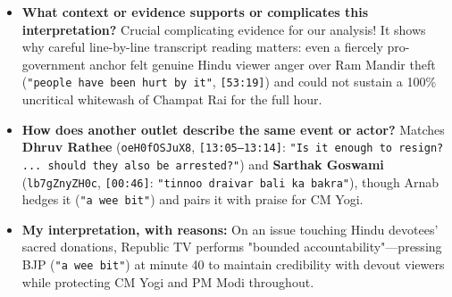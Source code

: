 \documentclass[10pt,a4paper]{article}
\begin{document}
\begin{itemize}[leftmargin=1.5em, itemsep=3pt, topsep=4pt]
  \item \textbf{What context or evidence supports or complicates this interpretation?} Crucial complicating evidence for our analysis! It shows why careful line-by-line transcript reading matters: even a fiercely pro-government anchor felt genuine Hindu viewer anger over Ram Mandir theft (\texttt{"people have been hurt by it"}, \texttt{[53:19]}) and could not sustain a 100\% uncritical whitewash of Champat Rai for the full hour.
  \item \textbf{How does another outlet describe the same event or actor?} Matches \textbf{Dhruv Rathee} (\texttt{oeH0fOSJuX8}, \texttt{[13:05--13:14]}: \texttt{"Is it enough to resign? ... should they also be arrested?"}) and \textbf{Sarthak Goswami} (\texttt{lb7gZnyZH0c}, \texttt{[00:46]}: \texttt{"tinnoo draivar bali ka bakra"}), though Arnab hedges it (\texttt{"a wee bit"}) and pairs it with praise for CM Yogi.
  \item \textbf{My interpretation, with reasons:} On an issue touching Hindu devotees' sacred donations, Republic TV performs "bounded accountability"---pressing BJP (\texttt{"a wee bit"}) at minute 40 to maintain credibility with devout viewers while protecting CM Yogi and PM Modi throughout.
\end{itemize}
\end{document}
